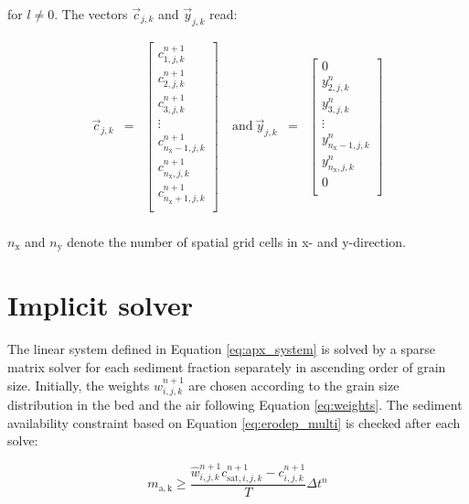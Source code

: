 \noindent for $l \neq 0$. The vectors $\vec{c}_{j,k}$ and $\vec{y}_{j,k}$
read:

\begin{equation}
  \begin{array}{rclrcl}
    \vec{c}_{j,k} &=& \left[ 
      \begin{array}{c}
        c^{n+1}_{1,j,k} \\
        c^{n+1}_{2,j,k} \\
        c^{n+1}_{3,j,k} \\
        \vdots \\
        c^{n+1}_{n_{\mathrm{x}}-1,j,k} \\
        c^{n+1}_{n_{\mathrm{x}},j,k} \\
        c^{n+1}_{n_{\mathrm{x}}+1,j,k} \\
    \end{array}
    \right] & ~ \mathrm{and} ~
    \vec{y}_{j,k} &=& \left[ 
      \begin{array}{c}
        0 \\
        y^n_{2,j,k} \\
        y^n_{3,j,k} \\
        \vdots \\
        y^n_{n_{\mathrm{x}}-1,j,k} \\
        y^n_{n_{\mathrm{x}},j,k} \\
        0 \\
      \end{array}
    \right] \\
    \end{array}
\end{equation}

\noindent $n_{\mathrm{x}}$ and $n_{\mathrm{y}}$ denote the number of
spatial grid cells in x- and y-direction.

\section{Implicit solver}

The linear system defined in Equation \ref{eq:apx_system} is solved by
a sparse matrix solver for each sediment fraction separately in
ascending order of grain size. Initially, the weights
$\hat{w}^{n+1}_{i,j,k}$ are chosen according to the grain size distribution
in the bed and the air following Equation \ref{eq:weights}. The
sediment availability constraint based on Equation
\ref{eq:erodep_multi} is checked after each solve:

\begin{equation}
  m_{\mathrm{a,k}} \geq \frac{\hat{w}^{n+1}_{i,j,k} c^{n+1}_{\mathrm{sat},i,j,k} - c^{n+1}_{i,j,k}}{T} \Delta t^n
\end{equation}

